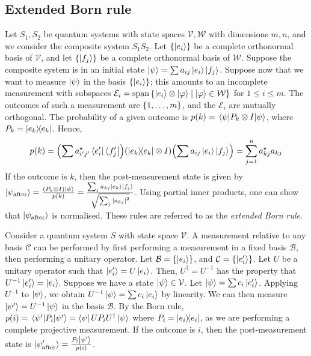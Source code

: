 \subsection{Extended Born rule}
Let \( S_1, S_2 \) be quantum systems with state spaces \( \mathcal V, \mathcal W \) with dimensions \( m, n \), and we consider the composite system \( S_1 S_2 \).
Let \( \qty{\ket{e_i}} \) be a complete orthonormal basis of \( \mathcal V \), and let \( \qty{\ket{f_j}} \) be a complete orthonormal basis of \( \mathcal W \).
Suppose the composite system is in an initial state \( \ket{\psi} = \sum a_{ij} \ket{e_i} \ket{f_j} \).
Suppose now that we want to measure \( \ket{\psi} \) in the basis \( \qty{\ket{e_i}} \); this amounts to an incomplete measurement with subspaces \( \mathcal E_i = \operatorname{span} \qty{\ket{e_i} \otimes \ket{\varphi} \mid \ket{\varphi} \in \mathcal W} \) for \( 1 \leq i \leq m \).
The outcomes of such a measurement are \( \qty{1, \dots, m} \), and the \( \mathcal E_i \) are mutually orthogonal.
The probability of a given outcome is \( p(k) = \ev{P_k \otimes I}{\psi} \), where \( P_k = \op{e_k}{e_k} \).
Hence,
\[ p(k) = \qty(\sum a_{i'j'}^\star \bra{e_i'} \bra{f_j'}) \qty(\op{e_k}{e_k} \otimes I) \qty(\sum a_{ij} \ket{e_i} \ket{f_j}) = \sum_{j=1}^n a_{kj}^\star a_{kj} \]
If the outcome is \( k \), then the post-measurement state is given by \( \ket{\psi_{\text{after}}} = \frac{(P_k \otimes I)\ket{\psi}}{p(k)} = \frac{\sum_j a_{kj} \ket{e_k} \ket{f_j}}{\sqrt{\sum_j \abs{a_{kj}}^2}} \).
Using partial inner products, one can show that \( \ket{\psi_{\text{after}}} \) is normalised.
These rules are referred to as the \emph{extended Born rule}.

Consider a quantum system \( S \) with state space \( \mathcal V \).
A measurement relative to any basis \( \mathcal C \) can be performed by first performing a measurement in a fixed basis \( \mathcal B \), then performing a unitary operator.
Let \( \mathcal B = \qty{\ket{e_i}} \), and \( \mathcal C = \qty{\ket{e_i'}} \).
Let \( U \) be a unitary operator such that \( \ket{e_i'} = U \ket{e_i} \).
Then, \( U^\dagger = U^{-1} \) has the property that \( U^{-1} \ket{e_i'} = \ket{e_i} \).
Suppose we have a state \( \ket{\psi} \in \mathcal V \).
Let \( \ket{\psi} = \sum c_i \ket{e_i'} \).
Applying \( U^{-1} \) to \( \ket{\psi} \), we obtain \( U^{-1} \ket{\psi} = \sum c_i \ket{e_i} \) by linearity.
We can then measure \( \ket{\psi'} = U^{-1} \ket{\psi} \) in the basis \( \mathcal B \).
By the Born rule, \( p(i) = \ev{P_i}{\psi'} = \bra{\psi} U P_i U^\dagger \ket{\psi} \) where \( P_i = \op{e_i}{e_i} \), as we are performing a complete projective measurement.
If the outcome is \( i \), then the post-measurement state is \( \ket{\psi'_{\text{after}}} = \frac{P_i \ket{\psi'}}{p(i)} \).

